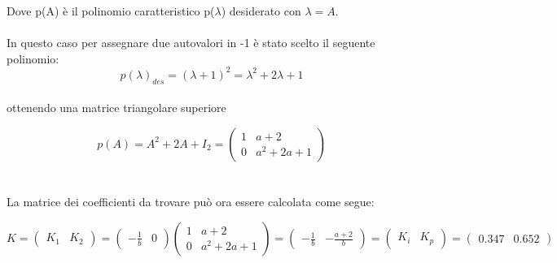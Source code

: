 \documentclass[a4paper,13pt]{article}
\begin{document}
		Dove p(A) è il polinomio caratteristico p($\lambda$) desiderato con $\lambda=A$.\\\\
	In questo caso per assegnare due autovalori in -1 è stato scelto il seguente polinomio:\\

\begin{equation*}
	p(\lambda)_{des}=(\lambda+1)^{2}=\lambda^{2}+2\lambda+1        %
\end{equation*} \\
	
	ottenendo una matrice triangolare superiore
	
\begin{equation*}
	p(A)=A^{2}+2A+I_{2}=
\begin{pmatrix}

	1&a+2\\0&a^{2}+2a+1

\end{pmatrix}
\end{equation*} \\ \\

	La matrice dei coefficienti da trovare può ora essere calcolata come segue:

\begin{equation*}
	K=
\begin{pmatrix}

	K_{1}&K_{2}

\end{pmatrix} =                  %
\begin{pmatrix}

	-\frac{1}{b}&0

\end{pmatrix}
\begin{pmatrix}

	1&a+2\\0&a^{2}+2a+1

\end{pmatrix} =                   %
\begin{pmatrix}

	-\frac{1}{b}&-\frac{a+2}{b}

\end{pmatrix} =                    %
\begin{pmatrix}

	K_{i}&K_{p}

\end{pmatrix} =                    %
\begin{pmatrix}

	0.347&0.652

\end{pmatrix}
\end{equation*}\\
\end{document}
